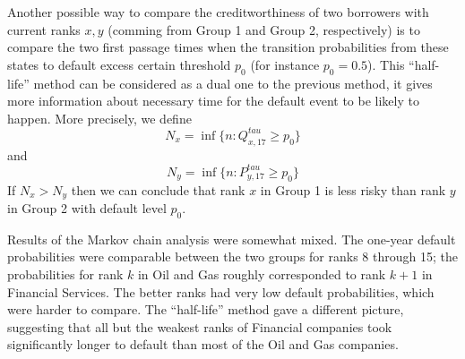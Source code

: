 \documentclass[runningheads,a4paper]{llncs}
\begin{document}
Another possible way to compare the creditworthiness of two borrowers with current ranks $x, y$ (comming from Group 1 and Group 2, respectively) is to compare the two first passage times when the transition probabilities from these states to default excess certain threshold $p_0$ (for instance $p_0=0.5$). This ``half-life''
method can be considered as a dual one to the previous method, it gives more information about necessary time  for the default event to  be likely to happen. More precisely, we define
$$N_x=\inf\{n: Q^{tau}_{x,17}\ge p_0\}$$
and
$$N_y=\inf\{n: P^{tau}_{y,17}\ge p_0\}$$
If $N_x>N_y$ then we can conclude that rank $x$ in Group 1 is less risky than rank $y$ in Group 2 with default level $p_0.$

Results of the Markov chain analysis were somewhat mixed.  The one-year default probabilities
were comparable between the two groups for ranks 8 through 15;  the probabilities for
rank $k$ in Oil and Gas roughly corresponded to rank $k+1$ in Financial Services.
The better ranks had very low default probabilities, which were harder to compare.  
The ``half-life''  method gave a different picture, suggesting that all but the weakest ranks 
of Financial companies took significantly longer to default than most of the Oil and Gas 
companies.



\nocite{*} 
\end{document}
